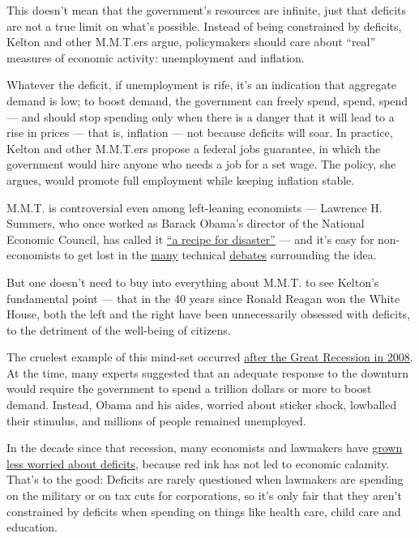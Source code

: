 This doesn't mean that the government's resources are infinite, just
that deficits are not a true limit on what's possible. Instead of being
constrained by deficits, Kelton and other M.M.T.ers argue, policymakers
should care about ``real'' measures of economic activity: unemployment
and inflation.

Whatever the deficit, if unemployment is rife, it's an indication that
aggregate demand is low; to boost demand, the government can freely
spend, spend, spend --- and should stop spending only when there is a
danger that it will lead to a rise in prices --- that is, inflation ---
not because deficits will soar. In practice, Kelton and other M.M.T.ers
propose a federal jobs guarantee, in which the government would hire
anyone who needs a job for a set wage. The policy, she argues, would
promote full employment while keeping inflation stable.

M.M.T. is controversial even among left-leaning economists --- Lawrence
H. Summers, who once worked as Barack Obama's director of the National
Economic Council, has called it
\href{https://www.washingtonpost.com/opinions/the-lefts-embrace-of-modern-monetary-theory-is-a-recipe-for-disaster/2019/03/04/6ad88eec-3ea4-11e9-9361-301ffb5bd5e6_story.html}{``a
recipe for disaster''} --- and it's easy for non-economists to get lost
in the
\href{https://crookedtimber.org/2020/06/01/modern-monetary-theory-neither-modern-nor-monetary-nor-mainly-theoretical/}{many}
technical
\href{https://www.bradford-delong.com/2019/03/james-montier-wonders-why-people-hate-mmt-he-is-about-to-discover-that-mmt-hates-him.html}{debates}
surrounding the idea.

But one doesn't need to buy into everything about M.M.T. to see Kelton's
fundamental point --- that in the 40 years since Ronald Reagan won the
White House, both the left and the right have been unnecessarily
obsessed with deficits, to the detriment of the well-being of citizens.

The cruelest example of this mind-set occurred
\href{https://www.nytimes.com/2019/09/18/opinion/obama-2008-financial-crisis.html}{after
the Great Recession in 2008}. At the time, many experts suggested that
an adequate response to the downturn would require the government to
spend a trillion dollars or more to boost demand. Instead, Obama and his
aides, worried about sticker shock, lowballed their stimulus, and
millions of people remained unemployed.

In the decade since that recession, many economists and lawmakers have
\href{https://www.nytimes.com/2020/05/16/business/deficits-virus-economists-trump.html}{grown
less worried about deficits}, because red ink has not led to economic
calamity. That's to the good: Deficits are rarely questioned when
lawmakers are spending on the military or on tax cuts for corporations,
so it's only fair that they aren't constrained by deficits when spending
on things like health care, child care and education.

